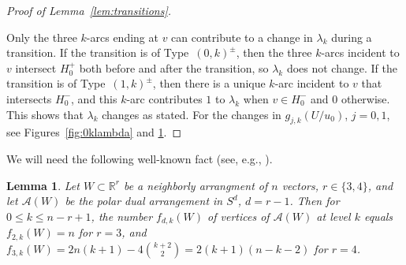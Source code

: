 \documentclass[11pt]{article}
\newtheorem{lemma}[theorem]{Lemma}
\renewcommand{\leq}{\leqslant}
\newcommand{\R}{\mathbb{R}}
\begin{document}
\begin{proof}[Proof of Lemma~\ref{lem:transitions}]
\begin{figure}[ht]
\label{fig:1klambda}
\end{figure}
%
Only the three $k$-arcs ending at $v$ can contribute to a change in $\lambda_k$ during a transition. If the transition is of Type~$(0,k)^{\pm}$, then the three $k$-arcs incident to $v$ intersect $H_0^+$ both before and after the transition, so $\lambda_k$ does not change. If the transition is of Type~$(1,k)^{\pm}$, then there is a unique $k$-arc incident to $v$ that intersects $H_0^-$, and this $k$-arc contributes $1$ to $\lambda_k$ when $v\in H_0^-$ and $0$ otherwise. This shows that $\lambda_k$ changes as stated. 
%
For the changes in $g_{j,k}(U/u_0)$, $j=0,1$, see Figures~\ref{fig:0klambda} and \ref{fig:1klambda}.\end{proof}
We will need the following well-known fact (see, e.g., \cite[Corollary~8]{Welzl:2001aa}).
\begin{lemma} 
\label{lem:k-facets-neighborly}
Let $W\subset \R^r$ be a neighborly arrangment of $n$ vectors, $r\in \{3,4\}$, and let $\mathcal{A}(W)$ be the polar dual arrangement in $S^d$, $d=r-1$. Then for $0\leq k\leq n-r+1$, the number $f_{d,k}(W)$ of vertices of $\mathcal{A}(W)$ at level $k$ equals $f_{2,k}(W)=n$ for $r=3$, and $f_{3,k}(W)=2n(k+1)-4\binom{k+2}{2}=2(k+1)(n-k-2)$ for $r=4$.
\end{lemma}
%
%
%
%
%
\end{document}
